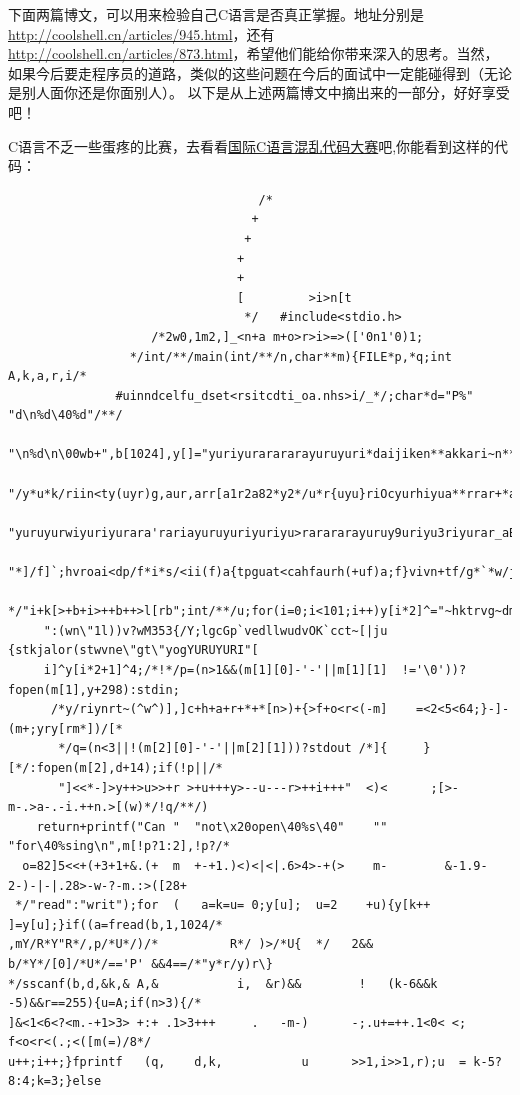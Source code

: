 \documentclass[a4paper]{book}
\begin{document}
下面两篇博文，可以用来检验自己C语言是否真正掌握。地址分别是\url{http://coolshell.cn/articles/945.html}，还有\url{http://coolshell.cn/articles/873.html}，希望他们能给你带来深入的思考。当然，如果今后要走程序员的道路，类似的这些问题在今后的面试中一定能碰得到（无论是别人面你还是你面别人）。 以下是从上述两篇博文中摘出来的一部分，好好享受吧！

C语言不乏一些蛋疼的比赛，去看看\href{http://www0.us.ioccc.org/years.html}{国际C语言混乱代码大赛}吧,你能看到这样的代码：

{\footnotesize\begin{shaded}\begin{verbatim}
	                               /*
	                              +
	                             +
	                            +
	                            +
	                            [         >i>n[t
	                             */   #include<stdio.h>
	                /*2w0,1m2,]_<n+a m+o>r>i>=>(['0n1'0)1;
	             */int/**/main(int/**/n,char**m){FILE*p,*q;int        A,k,a,r,i/*
	           #uinndcelfu_dset<rsitcdti_oa.nhs>i/_*/;char*d="P%"   "d\n%d\40%d"/**/
	         "\n%d\n\00wb+",b[1024],y[]="yuriyurarararayuruyuri*daijiken**akkari~n**"
	  "/y*u*k/riin<ty(uyr)g,aur,arr[a1r2a82*y2*/u*r{uyu}riOcyurhiyua**rrar+*arayra*="
       "yuruyurwiyuriyurara'rariayuruyuriyuriyu>rarararayuruy9uriyu3riyurar_aBrMaPrOaWy^?"
      "*]/f]`;hvroai<dp/f*i*s/<ii(f)a{tpguat<cahfaurh(+uf)a;f}vivn+tf/g*`*w/jmaa+i`ni("/**
     */"i+k[>+b+i>++b++>l[rb";int/**/u;for(i=0;i<101;i++)y[i*2]^="~hktrvg~dmG*eoa+%squ#l2"
     ":(wn\"1l))v?wM353{/Y;lgcGp`vedllwudvOK`cct~[|ju {stkjalor(stwvne\"gt\"yogYURUYURI"[
     i]^y[i*2+1]^4;/*!*/p=(n>1&&(m[1][0]-'-'||m[1][1]  !='\0'))?fopen(m[1],y+298):stdin;
      /*y/riynrt~(^w^)],]c+h+a+r+*+*[n>)+{>f+o<r<(-m]    =<2<5<64;}-]-(m+;yry[rm*])/[*
       */q=(n<3||!(m[2][0]-'-'||m[2][1]))?stdout /*]{     }[*/:fopen(m[2],d+14);if(!p||/*
       "]<<*-]>y++>u>>+r >+u+++y>--u---r>++i+++"  <)<      ;[>-m-.>a-.-i.++n.>[(w)*/!q/**/)
    return+printf("Can "  "not\x20open\40%s\40"    ""       "for\40%sing\n",m[!p?1:2],!p?/*
  o=82]5<<+(+3+1+&.(+  m  +-+1.)<)<|<|.6>4>-+(>    m-        &-1.9-2-)-|-|.28>-w-?-m.:>([28+
 */"read":"writ");for  (   a=k=u= 0;y[u];  u=2    +u){y[k++   ]=y[u];}if((a=fread(b,1,1024/*
,mY/R*Y"R*/,p/*U*/)/*          R*/ )>/*U{  */   2&& b/*Y*/[0]/*U*/=='P' &&4==/*"y*r/y)r\}
*/sscanf(b,d,&k,& A,&           i,  &r)&&        !   (k-6&&k -5)&&r==255){u=A;if(n>3){/*
]&<1<6<?<m.-+1>3> +:+ .1>3+++     .   -m-)      -;.u+=++.1<0< <; f<o<r<(.;<([m(=)/8*/
u++;i++;}fprintf   (q,    d,k,           u      >>1,i>>1,r);u  = k-5?8:4;k=3;}else

\end{verbatim}
\end{shaded}}
\end{document}
